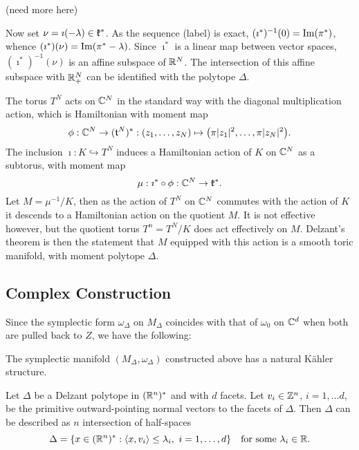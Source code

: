 (need more here)

Now set $\nu = \imath(-\lambda) \in \mathfrak{k}^{\ast}$. As the sequence (label) is exact, $(\imath^{\ast})^{-1}(0) = \operatorname{Im}(\pi^{\ast})$, whence $(\imath^{\ast})(\nu) = \operatorname{Im}(\pi^{\ast} - \lambda)$. Since $\imath^{\ast}$ is a linear map between vector spaces, $(\imath^{\ast})^{-1}(\nu)$ is an affine subspace of $\mathbb{R}^{N}$. The intersection of this affine subspace with $\mathbb{R}_{+}^{N}$ can be identified with the polytope $\Delta$.

The torus $T^{N}$ acts on $\mathbb{C}^{N}$ in the standard way with the diagonal multiplication action, which is Hamiltonian with moment map
\begin{equation*}
	\phi: \mathbb{C}^{N} \rightarrow (\mathfrak{t}^{N})^{\ast}: (z_{1}, \ldots, z_{N}) \mapsto \big(\pi |z_{1}|^{2}, \ldots, \pi |z_{N}|^{2}\big).
\end{equation*}
The inclusion $\imath: K \hookrightarrow T^{N}$ induces a Hamiltonian action of $K$ on $\mathbb{C}^{N}$ as a subtorus, with moment map
\begin{equation*}
	\mu: \imath^{\ast} \circ \phi: \mathbb{C}^{N} \rightarrow \mathfrak{k}^{\ast}.
\end{equation*}
Let $M = \mu^{-1} / K$, then as the action of $T^{N}$ on $\mathbb{C}^{N}$ commutes with the action of $K$ it descends to a Hamiltonian action on the quotient $M$. It is not effective however, but the quotient torus $T^{n} = T^{N}/K$ does act effectively on $M$. Delzant's theorem is then the statement that $M$ equipped with this action is a smooth toric manifold, with moment polytope $\Delta$.



\subsection{Complex Construction}



\newpage
Since the symplectic form $\omega_{\Delta}$ on $M_{\Delta}$ coincides with that of $\omega_{0}$ on $\mathbb{C}^{d}$ when both are pulled back to $Z$, we have the following:

\begin{cor}
	The symplectic manifold $(M_{\Delta},\omega_{\Delta})$ constructed above has a natural K{\"a}hler structure.
\end{cor}

\begin{rmk}
	Let $\Delta$ be a Delzant polytope in $(\mathbb{R}^{n})^{\ast}$ and with $d$ facets. Let $v_{i} \in \mathbb{Z}^{n}$, $i=1,\ldots d$, be the primitive outward-pointing normal vectors to the facets of $\Delta$. Then $\Delta$ can be described as $n$ intersection of half-spaces
	\begin{equation*}
	\Delta = \{ x\in (\RR^{n})^{\ast} : \langle x, v_{i} \rangle \leq \lambda_{i},\ i=1,\ldots, d \} \quad\text{for some } \lambda_{i}\in \RR.
	\end{equation*}
\end{rmk}

